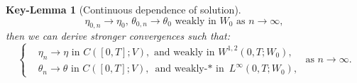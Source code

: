 \documentclass{sinst}
\numberwithin{equation}{section}
\theoremstyle{plain}
\newtheorem{keylem}{Key-Lemma}
\theoremstyle{definition}
\begin{document}
\begin{keylem}[Continuous dependence of solution]
  \begin{equation}
    \eta_{0,n} \to \eta_0, \, \theta_{0,n} \to \theta_0 \mbox{ weakly in } W_0 \mbox{ as } n \to \infty,
  \end{equation}
  then we can derive stronger convergences such that:
  \begin{equation}
    \left\{ \begin{aligned}
      &\eta_n \to \eta \mbox{ in } C([0,T];V), \mbox{ and weakly in } W^{1,2}(0,T;W_0),
      \\
      &\theta_n \to \theta \mbox{ in } C([0,T];V), \mbox{ and weakly-$*$ in } L^\infty(0,T;W_0),
    \end{aligned} \right. \mbox{ as } n \to \infty.
  \end{equation}
\end{keylem}
\end{document}
